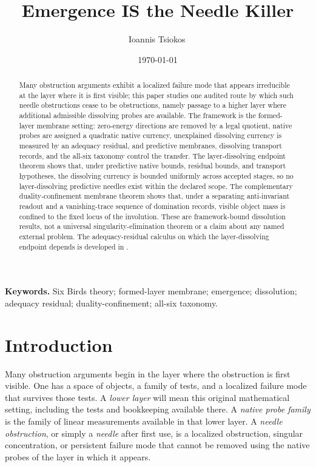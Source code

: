 \documentclass[11pt]{article}
\title{Emergence IS the Needle Killer}
\author{Ioannis Tsiokos\,\orcidlink{0009-0009-7659-5964}}
\date{\today}
\theoremstyle{definition}
\begin{document}
\maketitle
\thispagestyle{firstpage}

\begin{abstract}
Many obstruction arguments exhibit a localized failure mode that appears
irreducible at the layer where it is first visible; this paper studies
one audited route by which such needle obstructions cease to be
obstructions, namely passage to a higher layer where additional
admissible dissolving probes are available.  The framework is the
formed-layer membrane setting: zero-energy directions are removed by a
legal quotient, native probes are assigned a quadratic native currency,
unexplained dissolving currency is measured by an adequacy residual, and
predictive membranes, dissolving transport records, and the all-six
taxonomy control the transfer.  The layer-dissolving endpoint theorem
shows that, under predictive native bounds, residual bounds, and
transport hypotheses, the dissolving currency is bounded uniformly
across accepted stages, so no layer-dissolving predictive needles exist
within the declared scope.  The complementary duality-confinement
membrane theorem shows that, under a separating anti-invariant readout
and a vanishing-trace sequence of domination records, visible object
mass is confined to the fixed locus of the involution.  These are
framework-bound dissolution results, not a universal
singularity-elimination theorem or a claim about any named external
problem.  The adequacy-residual calculus on which the layer-dissolving
endpoint depends is developed in \citet{Tsiokos2026XiCompanion}.
\end{abstract}

\medskip
\noindent\textbf{Keywords.} Six Birds theory; formed-layer membrane; emergence; dissolution; adequacy residual; duality-confinement; all-six taxonomy.



\section{Introduction}
\label{sec:intro}

Many obstruction arguments begin in the layer where the obstruction is
first visible.  One has a space of objects, a family of tests, and a
localized failure mode that survives those tests.  A \emph{lower layer}
will mean this original mathematical setting, including the tests and
bookkeeping available there.  A \emph{native probe family} is the
family of linear measurements available in that lower layer.  A
\emph{needle obstruction}, or simply a \emph{needle} after first use, is
a localized obstruction, singular concentration, or persistent failure
mode that cannot be removed using the native probes of the layer in
which it appears.
\end{document}
